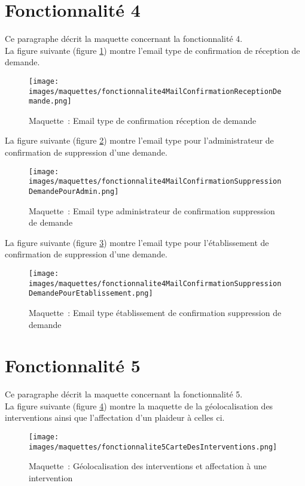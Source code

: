 \section{Fonctionnalité 4}
Ce paragraphe décrit la maquette concernant la fonctionnalité 4. \\

La figure suivante (figure \ref{maquette4-1}) montre l'email type de confirmation de réception de demande.
\begin{figure}[H]
	\centering
	\texttt{[image: images/maquettes/fonctionnalite4MailConfirmationReceptionDemande.png]}
	\caption{Maquette~: Email type de confirmation réception de demande}
	\label{maquette4-1}
\end{figure}

La figure suivante (figure \ref{maquette4-2}) montre l'email type pour l'administrateur de confirmation de suppression d'une demande.
\begin{figure}[H]
	\centering
	\texttt{[image: images/maquettes/fonctionnalite4MailConfirmationSuppressionDemandePourAdmin.png]}
	\caption{Maquette~: Email type administrateur de confirmation suppression de demande}
	\label{maquette4-2}
\end{figure}

La figure suivante (figure \ref{maquette4-3}) montre l'email type pour l'établissement de confirmation de suppression d'une demande.
\begin{figure}[H]
	\centering
	\texttt{[image: images/maquettes/fonctionnalite4MailConfirmationSuppressionDemandePourEtablissement.png]}
	\caption{Maquette~: Email type établissement de confirmation suppression de demande}
	\label{maquette4-3}
\end{figure}

\section{Fonctionnalité 5}
Ce paragraphe décrit la maquette concernant la fonctionnalité 5. \\

La figure suivante (figure \ref{maquette5-1}) montre la maquette de la géolocalisation des interventions ainsi que l'affectation d'un plaideur à celles ci. \\
\begin{figure}[H]
	\centering
	\texttt{[image: images/maquettes/fonctionnalite5CarteDesInterventions.png]}
	\caption{Maquette~: Géolocalisation des interventions et affectation à une intervention}
	\label{maquette5-1}
\end{figure}

